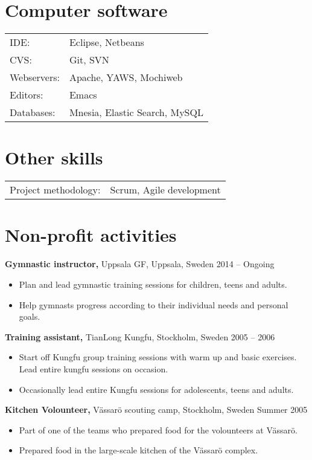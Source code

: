 \documentclass[margin]{res}
\begin{document}
\begin{resume}
\section{Computer software}
\begin{tabular}{l p{3in}}
  IDE: & Eclipse, Netbeans \\
  CVS: & Git, SVN \\
  Webservers: & Apache, YAWS, Mochiweb \\
  Editors: & Emacs \\
  Databases: & Mnesia, Elastic Search, MySQL
\end{tabular}

\section{Other skills}
\begin{tabular}{l p{3in}}
  Project methodology: & Scrum, Agile development
\end{tabular}

\section{Non-profit activities}
{\bf Gymnastic instructor,} Uppsala GF, Uppsala, Sweden \hfill 2014 -- Ongoing
\begin{itemize} \itemsep -2pt
\item Plan and lead gymnastic training sessions for children, teens and adults.
\item Help gymnasts progress according to their individual needs and personal goals.
\end{itemize}

{\bf Training assistant,} TianLong Kungfu, Stockholm, Sweden \hfill 2005 -- 2006
\begin{itemize} \itemsep -2pt
\item Start off Kungfu group training sessions with warm up and basic exercises. Lead entire kungfu sessions on occasion.
\item Occasionally lead entire Kungfu sessions for adolescents, teens and adults.
\end{itemize}

{\bf Kitchen Volounteer,} Vässarö scouting camp, Stockholm, Sweden \hfill Summer 2005
\begin{itemize} \itemsep -2pt
\item Part of one of the teams who prepared food for the volounteers at Vässarö.
\item Prepared food in the large-scale kitchen of the Vässarö complex.
\end{itemize}


\end{resume}
\end{document}
